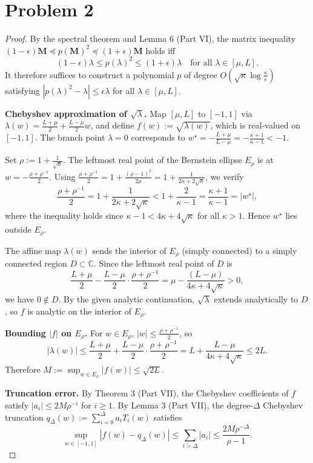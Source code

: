\section*{Problem 2}

\begin{proof}
By the spectral theorem and Lemma 6 (Part VI), the matrix inequality $(1-\epsilon)\mathbf{M} \preceq p(\mathbf{M})^2 \preceq (1+\epsilon)\mathbf{M}$ holds iff
\[
    (1-\epsilon)\lambda \leq p(\lambda)^2 \leq (1+\epsilon)\lambda \quad \text{for all } \lambda \in [\mu, L].
\]
It therefore suffices to construct a polynomial $p$ of degree $O(\sqrt{\kappa}\log\frac{\kappa}{\epsilon})$ satisfying $|p(\lambda)^2 - \lambda| \leq \epsilon\lambda$ for all $\lambda \in [\mu, L]$.

\textbf{Chebyshev approximation of $\sqrt{\lambda}$.}
Map $[\mu, L]$ to $[-1,1]$ via $\lambda(w) = \frac{L+\mu}{2} + \frac{L-\mu}{2}w$, and define $f(w) := \sqrt{\lambda(w)}$, which is real-valued on $[-1,1]$. The branch point $\lambda = 0$ corresponds to $w^\star = -\frac{L+\mu}{L-\mu} = -\frac{\kappa+1}{\kappa-1} < -1$.

Set $\rho := 1 + \frac{1}{\sqrt{\kappa}}$. The leftmost real point of the Bernstein ellipse $E_\rho$ is at $w = -\frac{\rho + \rho^{-1}}{2}$. Using $\frac{\rho+\rho^{-1}}{2} = 1 + \frac{(\rho-1)^2}{2\rho} = 1 + \frac{1}{2\kappa + 2\sqrt{\kappa}}$, we verify
\[
    \frac{\rho + \rho^{-1}}{2} = 1 + \frac{1}{2\kappa + 2\sqrt{\kappa}} < 1 + \frac{2}{\kappa - 1} = \frac{\kappa+1}{\kappa-1} = |w^\star|,
\]
where the inequality holds since $\kappa - 1 < 4\kappa + 4\sqrt{\kappa}$ for all $\kappa > 1$. Hence $w^\star$ lies outside $E_\rho$.

The affine map $\lambda(w)$ sends the interior of $E_\rho$ (simply connected) to a simply connected region $D \subset \mathbb{C}$. Since the leftmost real point of $D$ is
\[
    \frac{L+\mu}{2} - \frac{L-\mu}{2} \cdot \frac{\rho+\rho^{-1}}{2} = \mu - \frac{(L-\mu)}{4\kappa + 4\sqrt{\kappa}} > 0,
\]
we have $0 \notin D$. By the given analytic continuation, $\sqrt{\lambda}$ extends analytically to $D$, so $f$ is analytic on the interior of $E_\rho$.

\textbf{Bounding $|f|$ on $E_\rho$.}
For $w \in E_\rho$, $|w| \leq \frac{\rho+\rho^{-1}}{2}$, so
\[
    |\lambda(w)| \leq \frac{L+\mu}{2} + \frac{L-\mu}{2} \cdot \frac{\rho + \rho^{-1}}{2} = L + \frac{L-\mu}{4\kappa + 4\sqrt{\kappa}} \leq 2L.
\]
Therefore $M := \sup_{w \in E_\rho} |f(w)| \leq \sqrt{2L}$.

\textbf{Truncation error.}
By Theorem 3 (Part VII), the Chebyshev coefficients of $f$ satisfy $|a_i| \leq 2M\rho^{-i}$ for $i \geq 1$. By Lemma 3 (Part VII), the degree-$\Delta$ Chebyshev truncation $q_\Delta(w) := \sum_{i=0}^{\Delta} a_i T_i(w)$ satisfies
\[
    \sup_{w \in [-1,1]} |f(w) - q_\Delta(w)| \leq \sum_{i > \Delta} |a_i| \leq \frac{2M\rho^{-\Delta}}{\rho - 1}.
\]


\end{proof}
